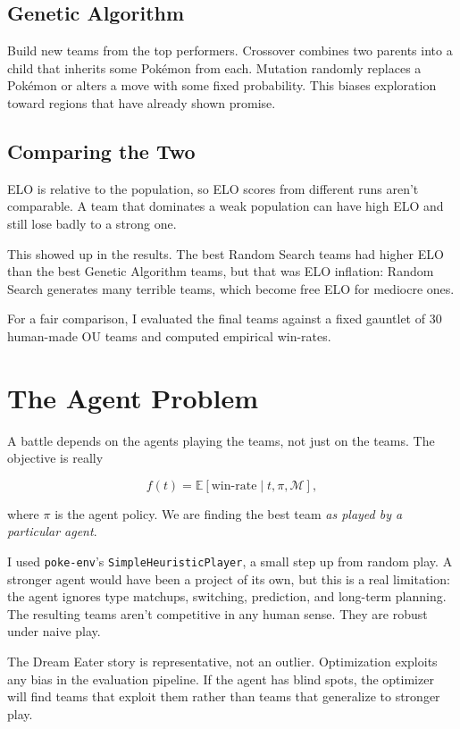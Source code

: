 \documentclass{article}
\begin{document}
\subsection{Genetic Algorithm}

Build new teams from the top performers. Crossover combines two parents into a child that inherits some Pokémon from each. Mutation randomly replaces a Pokémon or alters a move with some fixed probability. This biases exploration toward regions that have already shown promise.

\subsection{Comparing the Two}

ELO is relative to the population, so ELO scores from different runs aren't comparable. A team that dominates a weak population can have high ELO and still lose badly to a strong one.

This showed up in the results. The best Random Search teams had higher ELO than the best Genetic Algorithm teams, but that was ELO inflation: Random Search generates many terrible teams, which become free ELO for mediocre ones.

For a fair comparison, I evaluated the final teams against a fixed gauntlet of 30 human-made OU teams and computed empirical win-rates.

\section{The Agent Problem}

A battle depends on the agents playing the teams, not just on the teams. The objective is really

\[f(t) = \mathbb{E}[\text{win-rate} \mid t, \pi, \mathcal{M}],\]

where $\pi$ is the agent policy. We are finding the best team \emph{as played by a particular agent}.

I used \texttt{poke-env}'s \texttt{SimpleHeuristicPlayer}, a small step up from random play. A stronger agent would have been a project of its own, but this is a real limitation: the agent ignores type matchups, switching, prediction, and long-term planning. The resulting teams aren't competitive in any human sense. They are robust under naive play.

The Dream Eater story is representative, not an outlier. Optimization exploits any bias in the evaluation pipeline. If the agent has blind spots, the optimizer will find teams that exploit them rather than teams that generalize to stronger play.
\end{document}
